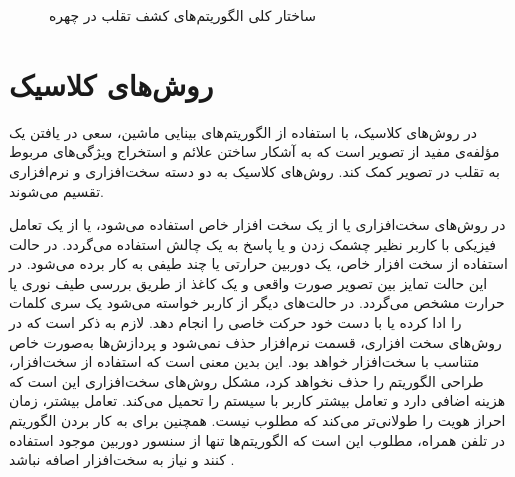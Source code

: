 \begin{figure}[ht]
	\centering
{}
\caption{ساختار کلی الگوریتم‌های کشف تقلب در چهره}
\label{fig:algs}
\end{figure}
\section{روش‌های کلاسیک}
در روش‌های کلاسیک، با استفاده از الگوریتم‌های بینایی ماشین، سعی در یافتن یک مؤلفه‌ی مفید از تصویر است که به آشکار ساختن  علائم و استخراج ویژگی‌های مربوط به تقلب در تصویر کمک کند. روش‌های کلاسیک به دو دسته سخت‌افزاری و نرم‌افزاری تقسیم می‌شوند.
\cite{ramachandra2017presentation}


در روش‌های سخت‌افزاری یا از یک سخت افزار خاص استفاده می‌شود، یا از یک تعامل فیزیکی با کاربر نظیر چشمک زدن و یا پاسخ به یک چالش استفاده می‌گردد.
در حالت استفاده از سخت افزار خاص، یک دوربین حرارتی یا چند طیفی به کار برده می‌شود. در این حالت تمایز بین تصویر صورت واقعی و یک کاغذ از طریق بررسی طیف نوری یا حرارت مشخص می‌گردد. در حالت‌های دیگر از کاربر خواسته می‌شود یک سری کلمات را ادا کرده یا با دست خود حرکت خاصی را انجام دهد.
لازم به ذکر است که در روش‌های سخت افزاری، قسمت نرم‌افزار حذف نمی‌شود و پردازش‌ها به‌صورت خاص متناسب با سخت‌افزار خواهد بود. این بدین معنی است که استفاده از سخت‌افزار، طراحی الگوریتم را حذف نخواهد کرد،
مشکل روش‌های سخت‌افزاری این است که هزینه اضافی دارد و تعامل بیشتر کاربر با سیستم را تحمیل می‌کند. تعامل بیشتر، زمان احراز هویت را طولانی‌تر می‌کند که مطلوب نیست. همچنین برای به کار بردن الگوریتم در تلفن همراه، مطلوب این است که الگوریتم‌ها تنها از سنسور دوربین موجود استفاده کنند و نیاز به سخت‌افزار اصافه نباشد
\cite{ramachandra2017presentation}.

